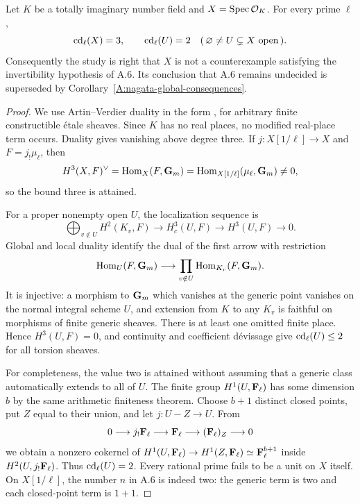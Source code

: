 \begin{proposition}
\label{A:arithmetic-test}
Let $K$ be a totally imaginary number field and $X=\operatorname{Spec}\mathcal O_K$. For every prime $\ell$,
\[
 \operatorname{cd}_\ell(X)=3,\qquad
 \operatorname{cd}_\ell(U)=2
 \quad (\,\varnothing\neq U\subsetneq X\text{ open}\,).
\]
Consequently the study is right that $X$ is not a counterexample satisfying the invertibility hypothesis of A.6. Its conclusion that A.6 remains undecided is superseded by Corollary~\ref{A:nagata-global-consequences}.
\end{proposition}
\begin{proof}
We use Artin--Verdier duality in the form \citet[Chapter II, Theorem 3.1, Corollary 3.2, and Proposition 2.3(a)]{A_Milne2006}, for arbitrary finite constructible étale sheaves. Since $K$ has no real places, no modified real-place term occurs. Duality gives vanishing above degree three. If $j:X[1/\ell]\to X$ and $F=j_!\mu_\ell$, then
\[
 H^3(X,F)^\vee
 =\operatorname{Hom}_X(F,\mathbf G_m)
 =\operatorname{Hom}_{X[1/\ell]}(\mu_\ell,\mathbf G_m)\neq0,
\]
so the bound three is attained.

For a proper nonempty open $U$, the localization sequence is
\[
 \bigoplus_{v\notin U}H^2(K_v,F)\longrightarrow H_c^3(U,F)
 \longrightarrow H^3(U,F)\longrightarrow0.
\]
Global and local duality identify the dual of the first arrow with restriction
\[
 \operatorname{Hom}_U(F,\mathbf G_m)\longrightarrow
 \prod_{v\notin U}\operatorname{Hom}_{K_v}(F,\mathbf G_m).
\]
It is injective: a morphism to $\mathbf G_m$ which vanishes at the generic point vanishes on the normal integral scheme $U$, and extension from $K$ to any $K_v$ is faithful on morphisms of finite generic sheaves. There is at least one omitted finite place. Hence $H^3(U,F)=0$, and continuity and coefficient dévissage give $\operatorname{cd}_\ell(U)\leq2$ for all torsion sheaves.

For completeness, the value two is attained without assuming that a generic class automatically extends to all of $U$. The finite group $H^1(U,\mathbf F_\ell)$ has some dimension $b$ by the same arithmetic finiteness theorem. Choose $b+1$ distinct closed points, put $Z$ equal to their union, and let $j:U-Z\to U$. From
\[
 0\longrightarrow j_!\mathbf F_\ell\longrightarrow\mathbf F_\ell
 \longrightarrow(\mathbf F_\ell)_Z\longrightarrow0
\]
we obtain a nonzero cokernel of
$H^1(U,\mathbf F_\ell)\to H^1(Z,\mathbf F_\ell)\simeq\mathbf F_\ell^{b+1}$
inside $H^2(U,j_!\mathbf F_\ell)$. Thus $\operatorname{cd}_\ell(U)=2$.
Every rational prime fails to be a unit on $X$ itself. On $X[1/\ell]$, the number $n$ in A.6 is indeed two: the generic term is two and each closed-point term is $1+1$.
\end{proof}

